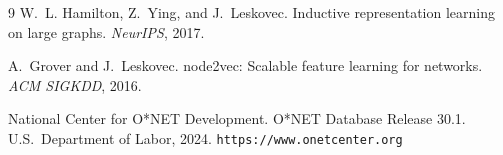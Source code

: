 \documentclass{article}
\begin{document}
\begin{thebibliography}{9}
W.~L. Hamilton, Z.~Ying, and J.~Leskovec.
Inductive representation learning on large graphs.
\textit{NeurIPS}, 2017.

A.~Grover and J.~Leskovec.
node2vec: Scalable feature learning for networks.
\textit{ACM SIGKDD}, 2016.

National Center for O*NET Development.
O*NET Database Release 30.1.
U.S.\ Department of Labor, 2024.
\texttt{https://www.onetcenter.org}
\end{thebibliography}
\end{document}
